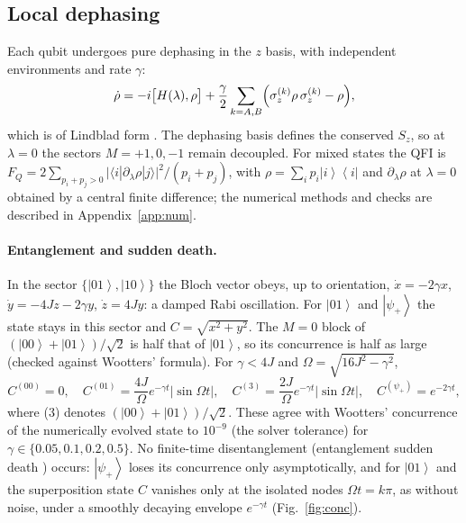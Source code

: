 \documentclass[10.5pt,a4paper]{article}
\newcommand{\ket}[1]{\left|#1\right\rangle}
\newcommand{\bra}[1]{\left\langle #1\right|}
\newcommand{\FQ}{F_Q}
\begin{document}
\subsection{Local dephasing}
Each qubit undergoes pure dephasing in the $z$ basis, with independent environments and rate $\gamma$:
\begin{equation}
  \dot\rho=-i\bigl[H(\lambda),\rho\bigr]+\frac\gamma2\sum_{k=A,B}\Bigl(\sigma_z^{(k)}\rho\,\sigma_z^{(k)}-\rho\Bigr),
  \label{eq:lindblad}
\end{equation}
which is of Lindblad form \cite{Lindblad1976,GKS1976,BreuerPetruccione2002}. The dephasing basis defines the conserved $S_z$, so at $\lambda=0$ the sectors $M=+1,0,-1$ remain decoupled. For mixed states the QFI is $\FQ=2\sum_{p_i+p_j>0}\lvert\langle i|\partial_\lambda\rho|j\rangle\rvert^2/(p_i+p_j)$, with $\rho=\sum_ip_i\ket i\!\bra i$ and $\partial_\lambda\rho$ at $\lambda=0$ obtained by a central finite difference; the numerical methods and checks are described in Appendix~\ref{app:num}.

\paragraph{Entanglement and sudden death.}
In the sector $\{\ket{01},\ket{10}\}$ the Bloch vector obeys, up to orientation, $\dot x=-2\gamma x$, $\dot y=-4Jz-2\gamma y$, $\dot z=4Jy$: a damped Rabi oscillation. For $\ket{01}$ and $\ket{\psi_+}$ the state stays in this sector and $C=\sqrt{x^2+y^2}$. The $M=0$ block of $(\ket{00}+\ket{01})/\sqrt2$ is half that of $\ket{01}$, so its concurrence is half as large (checked against Wootters' formula). For $\gamma<4J$ and $\Omega=\sqrt{16J^2-\gamma^2}$,
\begin{equation}
  C^{(00)}=0,\quad
  C^{(01)}=\frac{4J}{\Omega}e^{-\gamma t}\lvert\sin\Omega t\rvert,\quad
  C^{(3)}=\frac{2J}{\Omega}e^{-\gamma t}\lvert\sin\Omega t\rvert,\quad
  C^{(\psi_+)}=e^{-2\gamma t},
\end{equation}
where (3) denotes $(\ket{00}+\ket{01})/\sqrt2$. These agree with Wootters' concurrence of the numerically evolved state to $10^{-9}$ (the solver tolerance) for $\gamma\in\{0.05,0.1,0.2,0.5\}$. No finite-time disentanglement (entanglement sudden death \cite{YuEberly2004}) occurs: $\ket{\psi_+}$ loses its concurrence only asymptotically, and for $\ket{01}$ and the superposition state $C$ vanishes only at the isolated nodes $\Omega t=k\pi$, as without noise, under a smoothly decaying envelope $e^{-\gamma t}$ (Fig.~\ref{fig:conc}).
\end{document}
